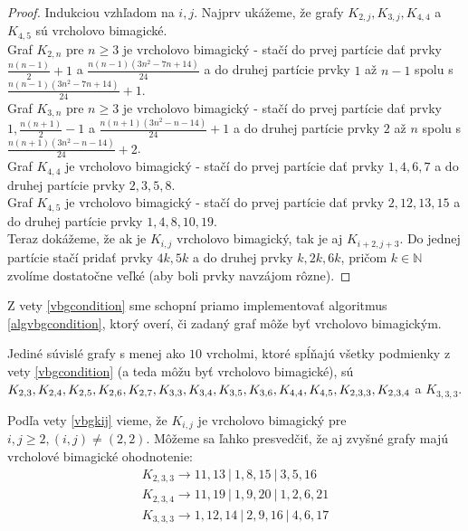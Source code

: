 \begin{proof} Indukciou vzhľadom na $i,j$. Najprv ukážeme, že grafy $K_{2,j}, K_{3,j}, K_{4,4}$ a $K_{4,5}$ sú vrcholovo bimagické. \\

Graf $K_{2,n}$ pre $n \geq 3$ je vrcholovo bimagický - stačí do prvej partície dať prvky $\frac{n(n-1)}{2} + 1$ a $\frac{n(n-1)(3n^2 - 7n + 14)}{24}$ a do druhej partície prvky $1$ až $n - 1$ spolu s $\frac{n(n-1)(3n^2 - 7n + 14)}{24} + 1$. \\

Graf $K_{3,n}$ pre $n \geq 3$ je vrcholovo bimagický - stačí do prvej partície dať prvky $1, \frac{n(n+1)}{2} - 1$ a $\frac{n(n+1)(3n^2 - n - 14)}{24} + 1$ a do druhej partície prvky $2$ až $n$ spolu s $\frac{n(n+1)(3n^2 - n - 14)}{24} + 2$. \\

Graf $K_{4,4}$ je vrcholovo bimagický - stačí do prvej partície dať prvky $1, 4, 6, 7$ a do druhej partície prvky $2, 3, 5, 8$. \\

Graf $K_{4,5}$ je vrcholovo bimagický - stačí do prvej partície dať prvky $2, 12, 13, 15$ a do druhej partície prvky $1, 4, 8, 10, 19$. \\

Teraz dokážeme, že ak je $K_{i,j}$ vrcholovo bimagický, tak je aj $K_{i+2,j+3}$. Do jednej partície stačí pridať prvky $4k, 5k$ a do druhej prvky $k, 2k, 6k$, pričom $k \in \mathbb{N}$ zvolíme dostatočne veľké (aby boli prvky navzájom rôzne).
\end{proof}

Z vety \ref{vbgcondition} sme schopní priamo implementovať algoritmus \ref{algvbgcondition}, ktorý overí, či zadaný graf môže byť vrcholovo bimagickým. 

\begin{result} Jediné súvislé grafy s menej ako $10$ vrcholmi, ktoré spĺňajú všetky podmienky z vety \ref{vbgcondition} (a teda môžu byť vrcholovo bimagické), sú $K_{2,3}, K_{2,4}, K_{2,5}, K_{2,6}, K_{2,7}, \\
 K_{3,3}, K_{3,4}, K_{3,5}, K_{3,6}, K_{4,4}, K_{4,5}, K_{2,3,3}, K_{2,3,4}$ a $K_{3,3,3}$.
\end{result}

Podľa vety \ref{vbgkij} vieme, že $K_{i,j}$ je vrcholovo bimagický pre $i,j \geq 2, (i,j) \neq (2,2)$. Môžeme sa ľahko presvedčiť, že aj zvyšné grafy majú vrcholové bimagické ohodnotenie:
\begin{gather*}
K_{2,3,3} \rightarrow 11, 13 ~|~ 1, 8, 15 ~|~ 3, 5, 16 \\
K_{2,3,4} \rightarrow 11, 19 ~|~ 1, 9, 20 ~|~ 1, 2, 6, 21 \\
K_{3,3,3} \rightarrow 1, 12, 14 ~|~ 2, 9, 16 ~|~ 4, 6, 17
\end{gather*}

